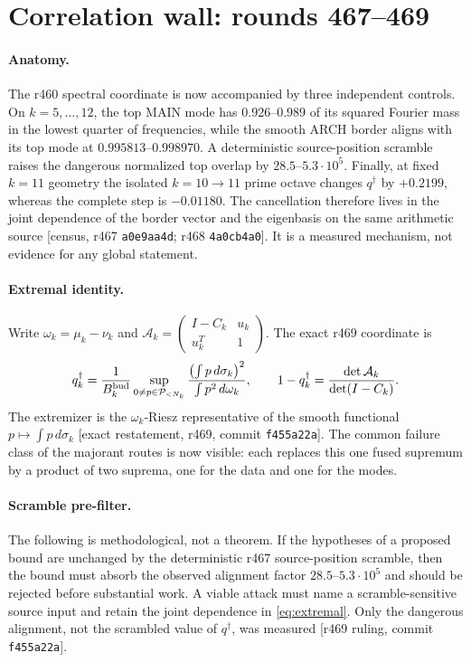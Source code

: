 \documentclass[11pt]{article}
\theoremstyle{remark}
\newcommand{\gr}[1]{\textnormal{\small[#1]}}
\begin{document}
\section{Correlation wall: rounds 467--469}\label{sec:wall}

\paragraph{Anatomy.}
The r460 spectral coordinate is now accompanied by three independent
controls.  On $k=5,\ldots,12$, the top MAIN mode has
$0.926$--$0.989$ of its squared Fourier mass in the lowest quarter
of frequencies, while the smooth ARCH border aligns with its top
mode at $0.995813$--$0.998970$.  A deterministic source-position
scramble raises the dangerous normalized top overlap by
$28.5$--$5.3\cdot10^5$.  Finally, at fixed $k=11$ geometry the
isolated $k=10\to11$ prime octave changes $q^\dagger$ by $+0.2199$,
whereas the complete step is $-0.01180$.  The cancellation therefore
lives in the joint dependence of the border vector and the
eigenbasis on the same arithmetic source
\gr{census, r467 \texttt{a0e9aa4d}; r468 \texttt{4a0cb4a0}}.
It is a measured mechanism, not evidence for any global statement.

\paragraph{Extremal identity.}
Write $\omega_k=\mu_k-\nu_k$ and
$\mathcal A_k=\left(\begin{smallmatrix}
I-C_k&u_k\\u_k^T&1
\end{smallmatrix}\right)$.  The exact r469 coordinate is
\begin{equation}\label{eq:extremal}
q_k^\dagger
=\frac1{B_k^{\rm bud}}
\sup_{0\ne p\in\mathcal P_{<N_k}}
\frac{\left(\int p\,d\sigma_k\right)^2}
     {\int p^2\,d\omega_k},
\qquad
1-q_k^\dagger
=\frac{\det\mathcal A_k}{\det(I-C_k)} .
\end{equation}
The extremizer is the $\omega_k$-Riesz representative of the smooth
functional $p\mapsto\int p\,d\sigma_k$ \gr{exact restatement,
r469, commit \texttt{f455a22a}}.  The common failure class of the
majorant routes is now visible: each replaces this one fused
supremum by a product of two suprema, one for the data and one for
the modes.

\paragraph{Scramble pre-filter.}
The following is methodological, not a theorem.  If the hypotheses
of a proposed bound are unchanged by the deterministic r467
source-position scramble, then the bound must absorb the observed
alignment factor $28.5$--$5.3\cdot10^5$ and should be rejected
before substantial work.  A viable attack must name a
scramble-sensitive source input and retain the joint dependence in
\eqref{eq:extremal}.  Only the dangerous alignment, not the
scrambled value of $q^\dagger$, was measured
\gr{r469 ruling, commit \texttt{f455a22a}}.
\end{document}
